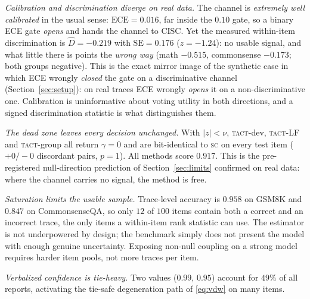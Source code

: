 \documentclass[conference]{IEEEtran}
\newcommand{\Dhat}{\widehat{D}}
\newcommand{\SC}{\textsc{sc}}
\newcommand{\TACT}{\textsc{tact}}
\begin{document}
\emph{Calibration and discrimination diverge on real data.} The channel is \emph{extremely well calibrated}
in the usual sense: $\mathrm{ECE}=0.016$, far inside the $0.10$ gate, so a
binary ECE gate \emph{opens} and hands the channel to CISC. Yet the measured
within-item discrimination is $\Dhat=-0.219$ with $\mathrm{SE}=0.176$
($z=-1.24$): no usable signal, and what little there is points the
\emph{wrong way} (math $-0.515$, commonsense $-0.173$; both groups negative).
This is the exact mirror image of the synthetic case in which ECE wrongly
\emph{closed} the gate on a discriminative channel (Section~\ref{sec:setup}):
on real traces ECE wrongly \emph{opens} it on a non-discriminative one.
Calibration is uninformative about voting utility in both directions, and a
signed discrimination statistic is what distinguishes them.

\emph{The dead zone leaves every decision unchanged.} With $|z|<\nu$,
\TACT-dev, \TACT-LF and \TACT-group all return $\gamma=0$ and are bit-identical
to \SC{} on every test item ($+0/-0$ discordant pairs, $p=1$). All methods score
$0.917$. This is the pre-registered null-direction prediction of
Section~\ref{sec:limits} confirmed on real data: where the channel carries no
signal, the method is free.

\emph{Saturation limits the usable sample.} Trace-level
accuracy is $0.958$ on GSM8K and $0.847$ on CommonsenseQA, so only $12$ of $100$
items contain both a correct and an incorrect trace, the only items a
within-item rank statistic can use. The estimator is not underpowered by
design; the benchmark simply does not present the model with enough genuine
uncertainty. Exposing non-null coupling on a strong model requires harder item
pools, not more traces per item.

\emph{Verbalized confidence is tie-heavy.} Two values ($0.99$, $0.95$)
account for $49\%$ of all reports, activating the tie-safe degeneration path of
\eqref{eq:vdw} on many items.
\end{document}
